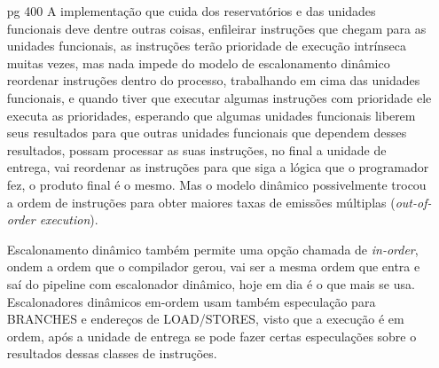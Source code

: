 \documentclass{article}
\begin{document}
\begin{enumerate}
\textbf{Escalonamento com pipeline dinâmico}: é um modelo que escolhe quais 
serão as próximas instruções a serem executadas, possivelmente reordenando 
elas para evitar \textit{stalls}. Em tais processadores que usam esse modelo, o 
pipeline é dividido em 3 unidades majoritárias: um \underline{buscador} de 
pacotes de instrução (\textit{mix}, \textit{issue packet}), múltiplas unidades 
funcionais\footnote{Cada unidade funcional tem buffers, chamado de estações 
reservatório, o que segura os ''operandos'' e ''operadores'', em 2008 
eram 12 unidades para se ter noção}, e uma unidade de \textit{commit}, que 
contém um buffer (\textit{enfileirador reordenador}), é usado para dar suporte 
aos operandos (registradores) da mesma maneira que a lógica de forwarding em 
escalonamento com pipeline estático. Quando um resultado é cometido para o 
banco de registradores, o resultado pode ser buscado diretamente de lá, assim 
como em um pipeline normal.

\item[pg 400] A implementação que cuida dos reservatórios e das unidades 
funcionais deve dentre outras coisas, enfileirar instruções que chegam para as 
unidades funcionais, as instruções terão prioridade de execução intrínseca 
muitas vezes, mas nada impede do modelo de escalonamento dinâmico reordenar 
instruções dentro do processo, trabalhando em cima das unidades funcionais, e 
quando tiver que executar algumas instruções com prioridade ele executa as 
prioridades, esperando que algumas unidades funcionais liberem seus resultados 
para que outras unidades funcionais que dependem desses resultados, possam 
processar as suas instruções, no final a unidade de entrega, vai reordenar as 
instruções para que siga a lógica que o programador fez, o produto final é o 
mesmo. Mas o modelo dinâmico possivelmente trocou a ordem de instruções para 
obter maiores taxas de emissões múltiplas (\textit{out-of-order execution}).

Escalonamento dinâmico também permite uma opção chamada de \textit{in-order}, 
ondem a ordem que o compilador gerou, vai ser a mesma ordem que entra e saí do 
pipeline com escalonador dinâmico, hoje em dia é o que mais se usa. 
Escalonadores dinâmicos em-ordem usam também especulação para BRANCHES e 
endereços de LOAD/STORES, visto que a execução é em ordem, após a unidade de 
entrega se pode fazer certas especulações sobre o resultados dessas classes de 
instruções.


\end{enumerate}
\end{document}
